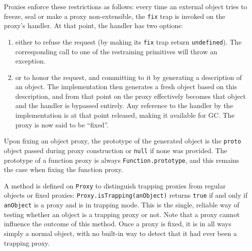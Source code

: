 \documentclass{acm_proc_article-sp}
\begin{document}
Proxies enforce these restrictions as follows: every time an external object tries to freeze, seal or make a proxy non-extensible, the \texttt{fix} trap is invoked on the proxy’s handler. At that point, the handler has two options:
\begin{enumerate}
  \item either to refuse the request (by making its \texttt{fix} trap return \texttt{undefined}). The corresponding call to one of the restraining primitives will throw an exception.
  \item or to honor the request, and committing to it by generating a description of an object. The implementation then generates a fresh object based on this description, and from that point on the proxy effectively becomes that object and the handler is bypassed entirely. Any reference to the handler by the implementation is at that point released, making it available for GC. The proxy is now said to be ``fixed''.  
\end{enumerate}

Upon fixing an object proxy, the prototype of the generated object is the \texttt{proto} object passed during proxy construction or \texttt{null} if none was provided. The prototype of a function proxy is always \texttt{Function.prototype}, and this remains the case when fixing the function proxy.



A method is defined on \texttt{Proxy} to distinguish trapping proxies from regular objects or fixed proxies:
\texttt{Proxy.isTrapping(anObject)} returns \texttt{true} if and only if \texttt{anObject} is a proxy and is in trapping mode. This is the single, reliable way of testing whether an object is a trapping proxy or not. Note that a proxy cannot influence the outcome of this method. Once a proxy is fixed, it is in all ways simply a normal object, with no built-in way to detect that it had ever been a trapping proxy.
\end{document}

